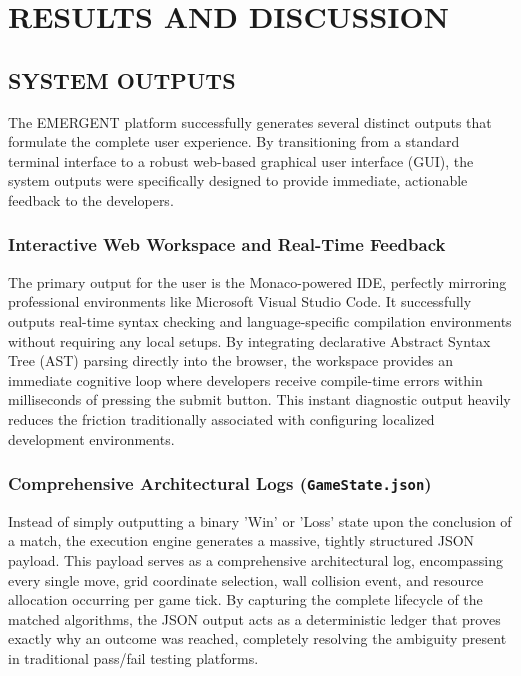 \documentclass[12pt,a4paper]{report}
\begin{document}
\chapter{RESULTS AND DISCUSSION}

\section{SYSTEM OUTPUTS}
The EMERGENT platform successfully generates several distinct outputs that formulate the complete user experience. By transitioning from a standard terminal interface to a robust web-based graphical user interface (GUI), the system outputs were specifically designed to provide immediate, actionable feedback to the developers.

\subsection{Interactive Web Workspace and Real-Time Feedback}
The primary output for the user is the Monaco-powered IDE, perfectly mirroring professional environments like Microsoft Visual Studio Code. It successfully outputs real-time syntax checking and language-specific compilation environments without requiring any local setups. By integrating declarative Abstract Syntax Tree (AST) parsing directly into the browser, the workspace provides an immediate cognitive loop where developers receive compile-time errors within milliseconds of pressing the submit button. This instant diagnostic output heavily reduces the friction traditionally associated with configuring localized development environments.

\subsection{Comprehensive Architectural Logs (\texttt{GameState.json})}
Instead of simply outputting a binary 'Win' or 'Loss' state upon the conclusion of a match, the execution engine generates a massive, tightly structured JSON payload. This payload serves as a comprehensive architectural log, encompassing every single move, grid coordinate selection, wall collision event, and resource allocation occurring per game tick. By capturing the complete lifecycle of the matched algorithms, the JSON output acts as a deterministic ledger that proves exactly why an outcome was reached, completely resolving the ambiguity present in traditional pass/fail testing platforms.
\end{document}
